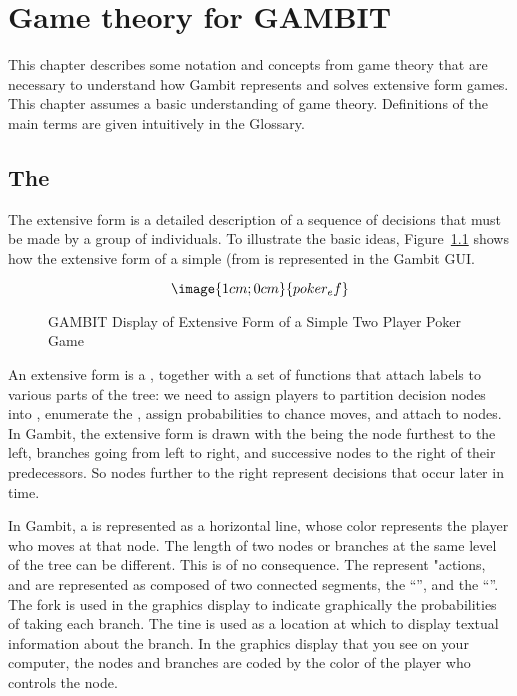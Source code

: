 \chapter{Game theory for GAMBIT}

This chapter describes some notation and concepts from game theory
that are necessary to understand how Gambit represents and solves
extensive form games.  This chapter assumes a basic understanding of game
theory.  Definitions of the main terms are given intuitively in the
Glossary.

\section{The }\label{extformsec}

The extensive form is a detailed description of a sequence of decisions 
that must be made by a group of individuals. To illustrate the basic ideas,
 Figure~\ref{fig:samp1} 
shows how the extensive form of a simple 
 (from \cite{mye:91} is represented
 in the Gambit GUI.  

\begin{figure}
$$\image{1cm;0cm}{poker_ef}$$
\caption{GAMBIT Display of Extensive Form of
		a Simple Two Player Poker Game}\label{fig:samp1}
\end{figure}

 An extensive form is a , together with a
set of functions that attach labels to various parts of the tree: we need
to assign players to  partition
decision nodes into , enumerate
the , assign probabilities to chance moves,
and attach  to nodes. In Gambit, the extensive
 form is drawn with the  being the node 
furthest to the left,
branches going from left to right, and successive nodes to the right of
their predecessors.  So nodes further to the right represent decisions
that occur later in time.

In Gambit, a  is represented as a
horizontal line, whose color represents the player who moves at that node.
The length of two nodes or branches at the same level of the tree can be
different.  This is of no consequence.  The  
represent "actions, and are represented as composed of two connected 
segments, the ``'', and the
``''.  The fork is used in the graphics display to
indicate graphically the probabilities of taking each branch.  The tine is
used as a location at which to display textual information about the
branch.  In the graphics display that you see on your computer, the nodes
and branches are coded by the color of the player who controls the node.

